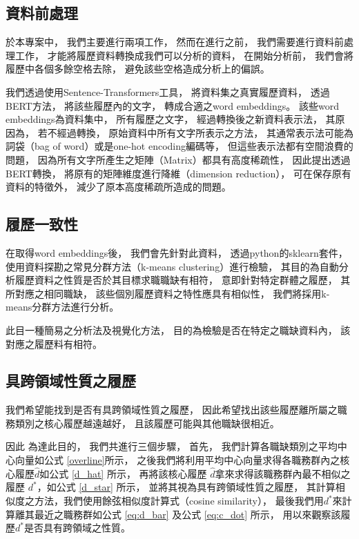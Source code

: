 \documentclass[acmsmall]{acmart}
\begin{document}
\subsection{資料前處理}

於本專案中，
我們主要進行兩項工作，
然而在進行之前，
我們需要進行資料前處理工作，
才能將履歷資料轉換成我們可以分析的資料，
在開始分析前，
我們會將履歷中各個多餘空格去除，
避免該些空格造成分析上的偏誤。

我們透過使用Sentence-Transformers\cite{reimers-2020-multilingual-sentence-bert}工具，
將資料集之真實履歷資料，
透過BERT方法\cite{devlin2018bert}，
將該些履歷內的文字，
轉成合適之word embeddings。
該些word embeddings為資料集中，
所有履歷之文字，
經過轉換後之新資料表示法，
其原因為，
若不經過轉換，
原始資料中所有文字所表示之方法，
其通常表示法可能為詞袋（bag of word）或是one-hot encoding編碼等，
但這些表示法都有空間浪費的問題，
因為所有文字所產生之矩陣（Matrix）都具有高度稀疏性\cite{schutze2008introduction}，
因此提出透過BERT轉換\cite{devlin2018bert}，
將原有的矩陣維度進行降維（dimension reduction），
可在保存原有資料的特徵外，
減少了原本高度稀疏所造成的問題。

\subsection{履歷一致性}

在取得word embeddings後，
我們會先針對此資料，
透過python的sklearn\cite{sklearn_api}套件，
使用資料探勘之常見分群方法（k-means clustering）進行檢驗\cite{han2011data}，
其目的為自動分析履歷資料之性質是否於其目標求職職缺有相符，
意即針對特定群體之履歷，
其所對應之相同職缺，
該些個別履歷資料之特性應具有相似性，
我們將採用k-means分群方法\cite{macqueen1967some}進行分析。

此目一種簡易之分析法及視覺化方法，
目的為檢驗是否在特定之職缺資料內，
該對應之履歷料有相符。


\subsection{具跨領域性質之履歷}

我們希望能找到是否有具跨領域性質之履歷，
因此希望找出該些履歷離所屬之職務類別之核心履歷越遠越好，
且該履歷可能與其他職缺很相近。

因此
為達此目的，
我們共進行三個步驟，
首先，
我們計算各職缺類別之平均中心向量如公式 \ref{overline}所示，
之後我們將利用平均中心向量求得各職務群內之核心履歷$\hat{d}$如公式 \ref{d_hat} 所示，
再將該核心履歷 $\hat{d}$拿來求得該職務群內最不相似之履歷 $d^{*}$，如公式 \ref{d_star} 所示，
並將其視為具有跨領域性質之履歷，
其計算相似度之方法，我們使用餘弦相似度計算式（cosine similarity）\cite{schutze2008introduction}，
最後我們用$d^{*}$來計算離其最近之職務群如公式 \ref{eq:d_bar} 及公式 \ref{eq:c_dot} 所示，
用以來觀察該履歷$d^{*}$是否具有跨領域之性質。
\end{document}
